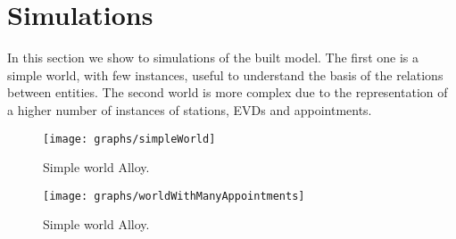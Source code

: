 \section{Simulations}
\label{sec: sim}%
In this section we show to simulations of the built model.
The first one is a simple world, with few instances, useful to understand the basis of the relations between entities.
The second world is more complex due to the representation of a higher number of instances of stations, EVDs and appointments.

\begin{sidewaysfigure}
	\begin{figure} [H]
		\begin{center}
			\texttt{[image: graphs/simpleWorld]}
			\caption{Simple world Alloy.}
			\label{fig: simple_world_alloy}
		\end{center}
	\end{figure}
\end{sidewaysfigure}

\begin{sidewaysfigure}
	\begin{figure} [H]
		\begin{center}
			\texttt{[image: graphs/worldWithManyAppointments]}
			\caption{Simple world Alloy.}
			\label{fig: many_appointments_world_alloy}
		\end{center}
	\end{figure}
\end{sidewaysfigure}
